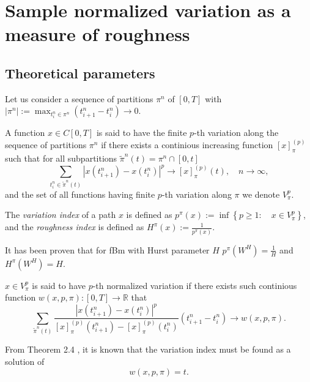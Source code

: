 \section{Sample normalized variation as a measure of roughness}
    \subsection{Theoretical parameters}
        Let us consider a sequence of partitions $\pi^n$ of $\left[0, T\right]$ with 
        $\left|\pi^n\right|:=\max_{t_i^n \in \pi^n} (t_{i+1}^n - t_i^n) \to 0$. 
        \begin{definition}
            A function $x \in C[0, T]$ is said to have the finite $p$-th variation along the sequence of partitions $\pi^n$ 
            if there exists a continious increasing function $\left[x\right]_{\pi}^{(p)}$ such that for all subpartitions $\tilde\pi^n(t) = \pi^n \cap [0, t]$
            \begin{equation}
                \sum_{t_i^n \in \tilde\pi^n(t)} \left|x(t_{i+1}^n) - x(t_i^n)\right|^p \to \left[x\right]_{\pi}^{(p)}(t), \quad n\to \infty,
            \end{equation}
            and the set of all functions having finite $p$-th variation along $\pi$ we denote $V_\pi^p$.
        \end{definition}
        \begin{definition}
            The \emph{variation index} of a path $x$ is defined as $p^\pi(x) := \inf \left\{p\geq 1 \colon \quad x\in V_\pi^p\right\}$, and the \emph{roughness index} is defined as $H^\pi(x):=\frac{1}{p^\pi(x)}$.
        \end{definition}
        It has been proven that for fBm with Hurst parameter $H$ $p^\pi(W^H) = \frac{1}{H}$ and $H^\pi(W^H) = H$.
        
        \begin{definition}
            $x\in V_\pi^p$ is said to have $p$-th normalized variation if there exists such continious function $w(x, p, \pi)\colon [0, T] \to \mathbb{R}$ that
            \begin{equation}
                \sum_{\tilde\pi^n(t)}\frac{\left|x(t_{i+1}^n) - x(t_i^n)\right|^p}{\left[x\right]_{\pi}^{(p)}(t_{i+1}^n)-\left[x\right]_{\pi}^{(p)}(t_i^n)} (t_{i+1}^n-t_{i}^n) \to w(x, p, \pi).
            \end{equation}
        \end{definition}

        From Theorem 2.4 \cite{Cont2022}, it is known that the variation index must be found as a solution of 
        \begin{equation}
            w(x, p, \pi) = t.
        \end{equation}
